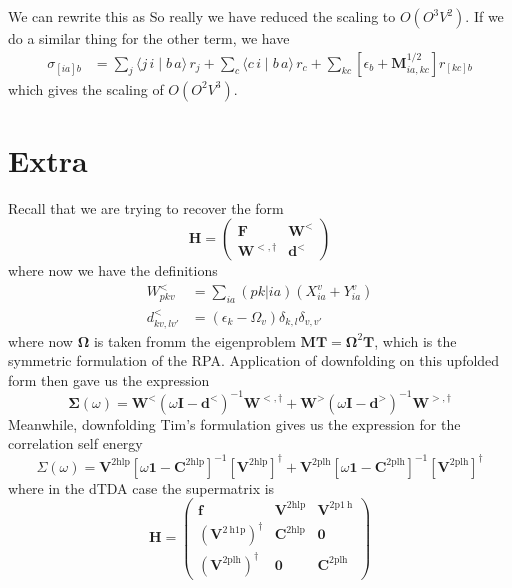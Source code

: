We can rewrite this as
So really we have reduced the scaling to $O(O^3V^2)$. If we do a similar thing for the other term, we have
\begin{align}
\sigma_{[ia]b} &= 
    \sum_{j} \bigl\langle j\,i \mid b\,a \bigr\rangle\,r_j
    + \sum_{c} \bigl\langle c\,i \mid b\,a \bigr\rangle\,r_c
    + \sum_{kc} \left[\epsilon_b + \bm{M}^{1/2}_{ia,kc}\right] r_{[kc] b}
\end{align}
which gives the scaling of $O(O^2V^3)$.
\section{Extra}
Recall that we are trying to recover the form 
\begin{equation}
    \bm{H} = \begin{pmatrix} \bm{F} & \bm{W}^<\\ \bm{W}^{<,\dagger} & \bm{d}^< \end{pmatrix}
\label{eq:booth_upfolded_hamiltonian2}
\end{equation}
where now we have the definitions
\begin{align}
    W_{pkv}^{<} &= \sum_{ia} (pk|ia) \left( X_{ia}^{v} + Y_{ia}^{v} \right) \\
    d_{kv,lv'}^{<} &= \left(\epsilon_k - \Omega_v\right) \delta_{k,l} \delta_{v,v'}
\label{eq:booth_definitions2}
\end{align}
where now $\bm{\Omega }$ is taken fromm the eigenproblem $\bm{M}\bm{T}= \bm{\Omega}^2 \bm{T}$, which is the symmetric formulation of the RPA.
Application of downfolding on this upfolded form then gave us the expression
\begin{equation}
    \mathbf{\Sigma }(\omega )=\mathbf{W}^<(\omega \mathbf{I}-{\mathbf{d}^<})^{-1} {\mathbf{W}}^{<,\dagger} + \mathbf{W}^>(\omega \mathbf{I}-{\mathbf{d}^>})^{-1} {\mathbf{W}}^{>,\dagger}
\label{eq:booth_self_energy}
\end{equation}
Meanwhile, downfolding Tim's formulation gives us the expression for the correlation self energy
\begin{equation}
    \Sigma(\omega)= \mathbf{V}^{2 \mathrm{hlp}}\left[\omega \mathbf{1}-\mathbf{C}^{2 \mathrm{hlp}}\right]^{-1}\left[\mathbf{V}^{2 \mathrm{hlp}}\right]^{\dagger} +\mathbf{V}^{2 \mathrm{plh}}\left[\omega \mathbf{1}-\mathbf{C}^{2 \mathrm{plh}}\right]^{-1}\left[\mathbf{V}^{2 \mathrm{plh}}\right]^{\dagger}
\end{equation}
where in the dTDA case the supermatrix is
\begin{equation}
    \mathbf{H}=\left(\begin{array}{ccc}
\mathbf{f} & \mathbf{V}^{2 \mathrm{hlp}} & \mathbf{V}^{2 \mathrm{p} 1 \mathrm{~h}} \\
\left(\mathbf{V}^{2 \mathrm{~h} 1 \mathrm{p}}\right)^{\dagger} & \mathbf{C}^{2 \mathrm{hlp}} & \mathbf{0} \\
\left(\mathbf{V}^{2 \mathrm{plh}}\right)^{\dagger} & \mathbf{0} & \mathbf{C}^{2 \mathrm{plh}}
\end{array}\right)
\end{equation}
